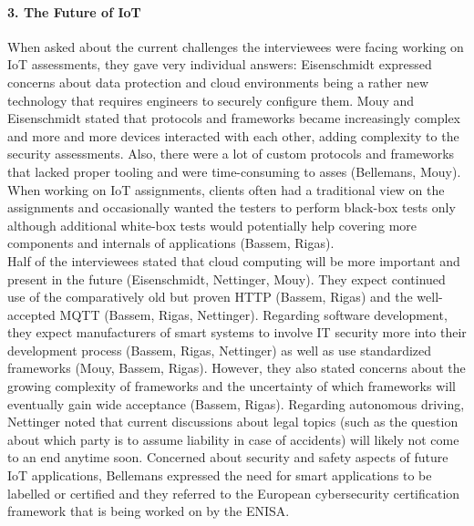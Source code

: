 \paragraph{3. The Future of \ac{IoT}} When asked about the current challenges the interviewees were facing working on \ac{IoT} assessments, they gave very individual answers: Eisenschmidt expressed concerns about data protection and cloud environments being a rather new technology that requires engineers to securely configure them. Mouy and Eisenschmidt stated that protocols and frameworks became increasingly complex and more and more devices interacted with each other, adding complexity to the security assessments. Also, there were a lot of custom protocols and frameworks that lacked proper tooling and were time-consuming to asses (Bellemans, Mouy). When working on \ac{IoT} assignments, clients often had a traditional view on the assignments and occasionally wanted the testers to perform black-box tests only although additional white-box tests would potentially help covering more components and internals of applications (Bassem, Rigas).\\
Half of the interviewees stated that cloud computing will be more important and present in the future (Eisenschmidt, Nettinger, Mouy). They expect continued use of the comparatively old but proven \ac{HTTP} (Bassem, Rigas) and the well-accepted \ac{MQTT} (Bassem, Rigas, Nettinger). Regarding software development, they expect manufacturers of smart systems to involve IT security more into their development process (Bassem, Rigas, Nettinger) as well as use standardized frameworks (Mouy, Bassem, Rigas). However, they also stated concerns about the growing complexity of frameworks and the uncertainty of which frameworks will eventually gain wide acceptance (Bassem, Rigas). Regarding autonomous driving, Nettinger noted that current discussions about legal topics (such as the question about which party is to  assume liability in case of accidents) will likely not come to an end anytime soon. Concerned about security and safety aspects of future \ac{IoT} applications, Bellemans expressed the need for smart applications to be labelled or certified and they referred to the European cybersecurity certification framework that is being worked on by the \ac{ENISA}.


